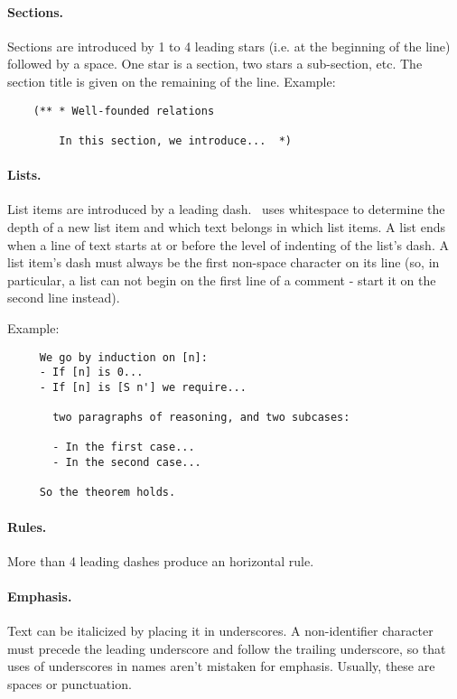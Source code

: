 \paragraph{Sections.}
Sections are introduced by 1 to 4 leading stars (i.e. at the beginning of the
line) followed by a space. One star is a section, two stars a sub-section, etc.
The section title is given on the remaining of the line.
Example:
\begin{verbatim}
    (** * Well-founded relations
  
        In this section, we introduce...  *)
\end{verbatim}




\paragraph{Lists.}
List items are introduced by a leading dash.  \coqdoc\ uses whitespace
to determine the depth of a new list item and which text belongs in
which list items.  A list ends when a line of text starts at or before
the level of indenting of the list's dash.  A list item's dash must
always be the first non-space character on its line (so, in
particular, a list can not begin on the first line of a comment -
start it on the second line instead).

Example:
\begin{verbatim}
     We go by induction on [n]:
     - If [n] is 0...
     - If [n] is [S n'] we require...

       two paragraphs of reasoning, and two subcases:

       - In the first case...
       - In the second case...

     So the theorem holds.
\end{verbatim}

\paragraph{Rules.}
More than 4 leading dashes produce an horizontal rule.

\paragraph{Emphasis.}
Text can be italicized by placing it in underscores.  A non-identifier
character must precede the leading underscore and follow the trailing
underscore, so that uses of underscores in names aren't mistaken for
emphasis.  Usually, these are spaces or punctuation.

